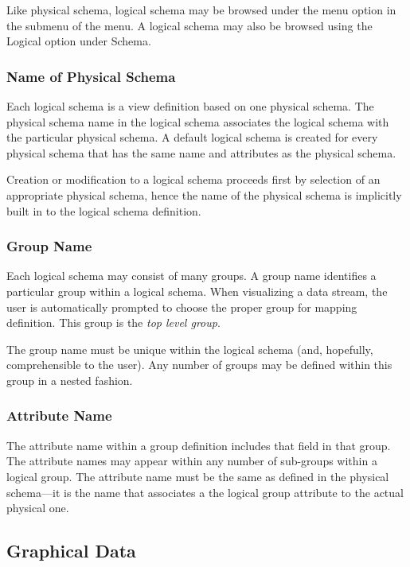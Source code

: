Like physical schema, logical schema may be browsed under the 
menu option in the  submenu of the  menu.  A logical
schema may also be browsed using the Logical option under Schema.

\subsubsection{Name of Physical Schema}

Each logical schema is a view definition based on one physical schema. The
physical schema name in the logical schema associates the logical schema with
the particular physical schema. A default logical schema is created for every
physical schema that has the same name and attributes as the physical schema.

Creation or modification to a logical schema proceeds first by selection of an
appropriate physical schema, hence the name of the physical schema is implicitly
built in to the logical schema definition.

\subsubsection{Group Name}

Each logical schema may consist of many groups. A group name identifies a
particular group within a logical schema. When visualizing a data stream, the
user is automatically prompted to choose the proper group for mapping
definition. This group is the {\em top level group}.

The group name must be unique within the logical schema (and, hopefully,
comprehensible to the user). Any number of groups may be defined within this
group in a nested fashion.

\subsubsection{Attribute Name}

The attribute name within a group definition includes that field in that
group. The attribute names may appear within any number of sub-groups within a
logical group. The attribute name must be the same as defined in the physical
schema---it is the name that associates a the logical group attribute to the
actual physical one.


\subsection{Graphical Data}
\label{sect:GData}


